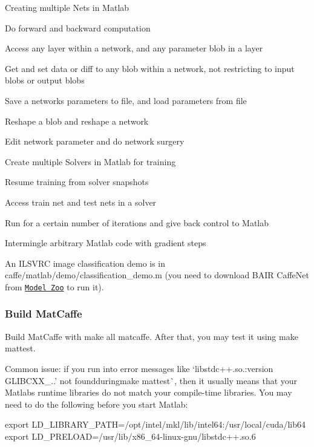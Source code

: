 \begin{DoxyItemize}
\item Creating multiple Nets in Matlab
\item Do forward and backward computation
\item Access any layer within a network, and any parameter blob in a layer
\item Get and set data or diff to any blob within a network, not restricting to input blobs or output blobs
\item Save a network\textquotesingle{}s parameters to file, and load parameters from file
\item Reshape a blob and reshape a network
\item Edit network parameter and do network surgery
\item Create multiple Solvers in Matlab for training
\item Resume training from solver snapshots
\item Access train net and test nets in a solver
\item Run for a certain number of iterations and give back control to Matlab
\item Intermingle arbitrary Matlab code with gradient steps
\end{DoxyItemize}

An I\+L\+S\+V\+RC image classification demo is in caffe/matlab/demo/classification\+\_\+demo.\+m (you need to download B\+A\+IR Caffe\+Net from \href{http://caffe.berkeleyvision.org/model_zoo.html}{\tt Model Zoo} to run it).

\subsubsection*{Build Mat\+Caffe}

Build Mat\+Caffe with {\ttfamily make all matcaffe}. After that, you may test it using {\ttfamily make mattest}.

Common issue\+: if you run into error messages like `libstdc++.so.\+:version \textquotesingle{}G\+L\+I\+B\+C\+X\+X\+\_..' not found{\ttfamily during}make mattest\`{}, then it usually means that your Matlab\textquotesingle{}s runtime libraries do not match your compile-\/time libraries. You may need to do the following before you start Matlab\+: \begin{DoxyVerb}export LD_LIBRARY_PATH=/opt/intel/mkl/lib/intel64:/usr/local/cuda/lib64
export LD_PRELOAD=/usr/lib/x86_64-linux-gnu/libstdc++.so.6
\end{DoxyVerb}


